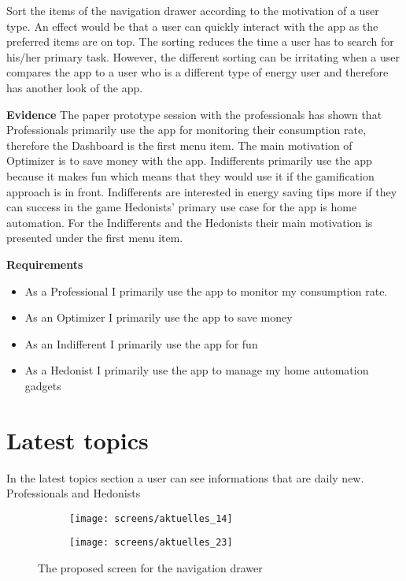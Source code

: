  Sort the items of the navigation drawer according to the motivation of a user type. An effect would be that a user can quickly interact with the app as the preferred items are on top. The sorting reduces the time a user has to search for his/her primary task. However, the different sorting can be irritating when a user compares the app to a user who is a different type of energy user and therefore has another look of the app.
 
\textbf{Evidence} \quad The paper prototype session with the professionals has shown that Professionals primarily use the app for monitoring their consumption rate, therefore the Dashboard is the first menu item. The main motivation of Optimizer is to save money with the app. Indifferents primarily use the app because it makes fun which means that they would use it if the gamification approach is in front. Indifferents are interested in energy saving tips more if they can success in the game
Hedonists' primary use case for the app is home automation. For the Indifferents and the Hedonists their main motivation is presented under the first menu item.

\textbf{Requirements}
\begin{itemize}
	\item As a Professional I primarily use the app to monitor my consumption rate.
	\item As an Optimizer I primarily use the app to save money
	\item As an Indifferent I primarily use the app for fun
	\item As a Hedonist I primarily use the app to manage my home automation gadgets	
\end{itemize}


\section{Latest topics}

In the latest topics section a user can see informations that are daily new. Professionals and Hedonists 

\begin{figure}[h]
	\centering
	\begin{subfigure}[b]{0.24\columnwidth}
		\centering
		\texttt{[image: screens/aktuelles\_14]}
		\label{fig:aktuelles:professional}
	\end{subfigure}
	\begin{subfigure}[b]{0.24\columnwidth}
		\centering
		\texttt{[image: screens/aktuelles\_23]}
		\label{fig:aktuelles:optimizer}
	\end{subfigure}
	\caption{The proposed screen for the navigation drawer}
	\label{fig:aktuelles} %
\end{figure}


